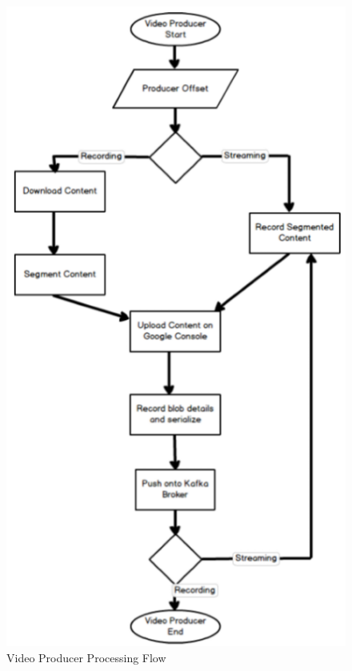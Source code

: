 \documentclass[10pt,conference]{IEEEtran}
\begin{document}
\begin{figure}
  \includegraphics[width=\linewidth]{ProducerVideoFlow.png}
  \caption                          {Video Producer Processing Flow}
  \label                            {fig:ProducerVideoFlow}
\end{figure}
\end{document}
